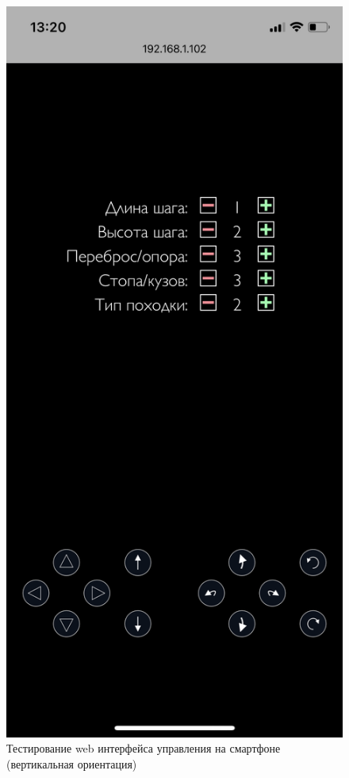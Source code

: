 \begin{figure}[h!]
	\centering
	\includegraphics[height = 0.5\textheight]{img/test3}
	\caption{Тестирование web интерфейса управления на смартфоне (вертикальная ориентация)}
	\label{img:test3}
\end{figure}

